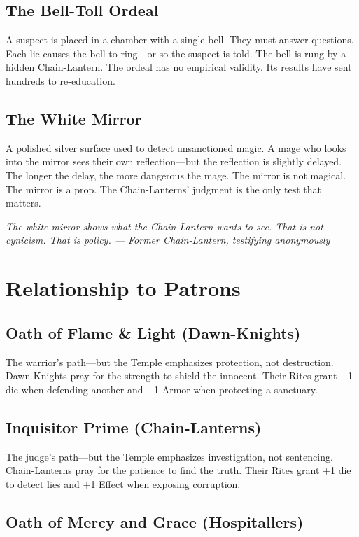 \documentclass{book}
\newcommand{\citation}[1]{\textcolor{marginalia}{\small\textit{#1}}}
\begin{document}
\section{The Bell-Toll Ordeal}

A suspect is placed in a chamber with a single bell. They must answer questions. Each lie causes the bell to ring---or so the suspect is told. The bell is rung by a hidden Chain-Lantern. The ordeal has no empirical validity. Its results have sent hundreds to re-education.

\section{The White Mirror}

A polished silver surface used to detect unsanctioned magic. A mage who looks into the mirror sees their own reflection---but the reflection is slightly delayed. The longer the delay, the more dangerous the mage. The mirror is not magical. The mirror is a prop. The Chain-Lanterns' judgment is the only test that matters.

\citation{The white mirror shows what the Chain-Lantern wants to see. That is not cynicism. That is policy. --- Former Chain-Lantern, testifying anonymously}

\chapter{Relationship to Patrons}

\section{Oath of Flame \& Light (Dawn-Knights)}

The warrior's path---but the Temple emphasizes protection, not destruction. Dawn-Knights pray for the strength to shield the innocent. Their Rites grant +1 die when defending another and +1 Armor when protecting a sanctuary.

\section{Inquisitor Prime (Chain-Lanterns)}

The judge's path---but the Temple emphasizes investigation, not sentencing. Chain-Lanterns pray for the patience to find the truth. Their Rites grant +1 die to detect lies and +1 Effect when exposing corruption.

\section{Oath of Mercy and Grace (Hospitallers)}
\end{document}
